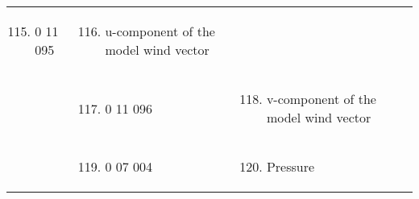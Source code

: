 \begin{longtable}[]{@{}llll@{}}
\begin{minipage}[t]{0.22\columnwidth}
\begin{enumerate}
\setcounter{enumi}{114}
\item
  0 11 095
\end{enumerate}\strut
\end{minipage} & \begin{minipage}[t]{0.22\columnwidth}\raggedright
\begin{enumerate}
\setcounter{enumi}{115}
\item
  u-component of the model wind vector
\end{enumerate}\strut
\end{minipage} & \begin{minipage}[t]{0.22\columnwidth}\raggedright
\strut
\end{minipage}\tabularnewline
\begin{minipage}[t]{0.22\columnwidth}\raggedright
\strut
\end{minipage} & \begin{minipage}[t]{0.22\columnwidth}\raggedright
\begin{enumerate}
\setcounter{enumi}{116}
\item
  0 11 096
\end{enumerate}\strut
\end{minipage} & \begin{minipage}[t]{0.22\columnwidth}\raggedright
\begin{enumerate}
\setcounter{enumi}{117}
\item
  v-component of the model wind vector
\end{enumerate}\strut
\end{minipage} & \begin{minipage}[t]{0.22\columnwidth}\raggedright
\strut
\end{minipage}\tabularnewline
\begin{minipage}[t]{0.22\columnwidth}\raggedright
\strut
\end{minipage} & \begin{minipage}[t]{0.22\columnwidth}\raggedright
\begin{enumerate}
\setcounter{enumi}{118}
\item
  0 07 004
\end{enumerate}\strut
\end{minipage} & \begin{minipage}[t]{0.22\columnwidth}\raggedright
\begin{enumerate}
\setcounter{enumi}{119}
\item
  Pressure
\end{enumerate}\strut
\end{minipage} & \begin{minipage}[t]{0.22\columnwidth}\raggedright

\end{minipage}
\end{longtable}
